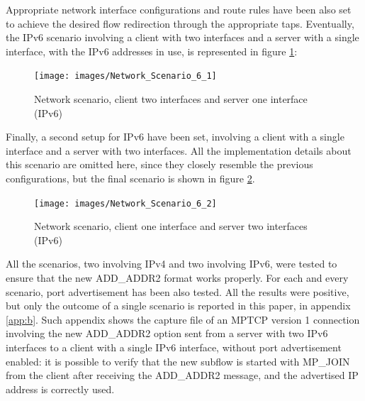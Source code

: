 

%

Appropriate network interface configurations and route rules have been also set to achieve the desired flow redirection through the appropriate taps. Eventually, the IPv6 scenario involving a client with two interfaces and a server with a single interface, with the IPv6 addresses in use, is represented in figure \ref{fig:netip6_1}:

\begin{figure}[!htb]
\centering
\texttt{[image: images/Network\_Scenario\_6\_1]}
\caption{Network scenario, client two interfaces and server one interface (IPv6)}
\label{fig:netip6_1}
\end{figure}

Finally, a second setup for IPv6 have been set, involving a client with a single interface and a server with two interfaces. All the implementation details about this scenario are omitted here, since they closely resemble the previous configurations, but the final scenario is shown in figure \ref{fig:netip6_2}.

\begin{figure}[!htb]
\centering
\texttt{[image: images/Network\_Scenario\_6\_2]}
\caption{Network scenario, client one interface and server two interfaces (IPv6)}
\label{fig:netip6_2}
\end{figure}

All the scenarios, two involving IPv4 and two involving IPv6, were tested to ensure that the new ADD\_ADDR2 format works properly. For each and every scenario, port advertisement has been also tested. All the results were positive, but only the outcome of a single scenario is reported in this paper, in appendix \ref{app:b}. Such appendix shows the capture file of an MPTCP version 1 connection involving the new ADD\_ADDR2 option sent from a server with two IPv6 interfaces to a client with a single IPv6 interface, without port advertisement enabled: it is possible to verify that the new subflow is started with MP\_JOIN from the client after receiving the ADD\_ADDR2 message, and the advertised IP address is correctly used.

